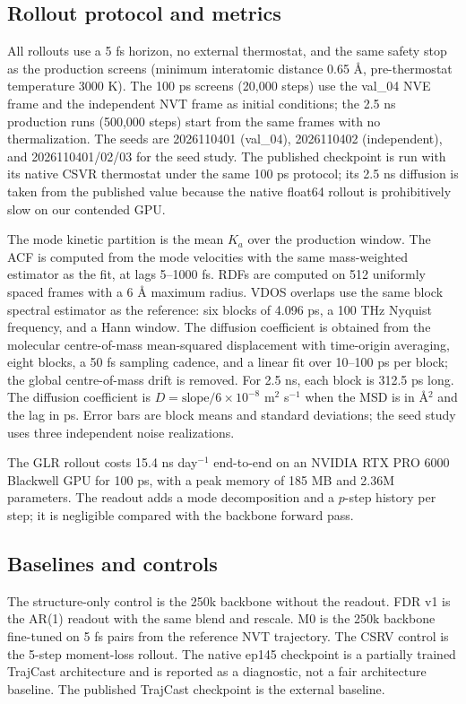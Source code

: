 \subsection{Rollout protocol and metrics}

All rollouts use a 5 fs horizon, no external thermostat, and the same safety stop as the
production screens (minimum interatomic distance 0.65 \AA, pre-thermostat temperature 3000 K).
The 100 ps screens (20,000 steps) use the val\_04 NVE frame and the independent NVT frame as
initial conditions; the 2.5 ns production runs (500,000 steps) start from the same frames with
no thermalization. The seeds are 2026110401 (val\_04), 2026110402 (independent), and
2026110401/02/03 for the seed study. The published checkpoint is run with its native CSVR
thermostat under the same 100 ps protocol; its 2.5 ns diffusion is taken from the published value
because the native float64 rollout is prohibitively slow on our contended GPU.

The mode kinetic partition is the mean \(K_a\) over the production window. The ACF is computed
from the mode velocities with the same mass-weighted estimator as the fit, at lags 5--1000 fs.
RDFs are computed on 512 uniformly spaced frames with a 6 \AA{} maximum radius. VDOS overlaps use
the same block spectral estimator as the reference: six blocks of 4.096 ps, a 100 THz Nyquist
frequency, and a Hann window. The diffusion coefficient is obtained from the molecular
centre-of-mass mean-squared displacement with time-origin averaging, eight blocks, a 50 fs
sampling cadence, and a linear fit over 10--100 ps per block; the global centre-of-mass drift is
removed. For 2.5 ns, each block is 312.5 ps long. The diffusion coefficient is
\(D=\mathrm{slope}/6\times10^{-8}\) m\(^2\) s\(^{-1}\) when the MSD is in \AA\(^2\) and the lag in
ps. Error bars are block means and standard deviations; the seed study uses three independent
noise realizations.

The GLR rollout costs 15.4 ns day\(^{-1}\) end-to-end on an NVIDIA RTX PRO 6000 Blackwell GPU for
100 ps, with a peak memory of 185 MB and 2.36M parameters. The readout adds a mode decomposition
and a \(p\)-step history per step; it is negligible compared with the backbone forward pass.

\subsection{Baselines and controls}

The structure-only control is the 250k backbone without the readout. FDR v1 is the AR(1) readout
with the same blend and rescale. M0 is the 250k backbone fine-tuned on 5 fs pairs from the
reference NVT trajectory. The CSRV control is the 5-step moment-loss rollout. The native ep145
checkpoint is a partially trained TrajCast architecture and is reported as a diagnostic, not a
fair architecture baseline. The published TrajCast checkpoint is the external baseline.

